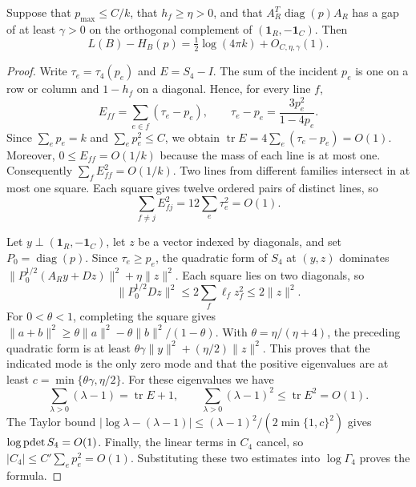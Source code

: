 \begin{lema}\label{coste-estatico}
Suppose that $p_{\max}\le C/k$, that $h_f\ge\eta>0$, and that
$A_R^T\operatorname{diag}(p)A_R$ has a gap of at least $\gamma>0$ on the orthogonal complement
of $(\mathbf1_R,-\mathbf1_C)$. Then
\[
 L(B)-H_B(p)=\tfrac12\log(4\pi k)+O_{C,\eta,\gamma}(1).
\]
\end{lema}
\begin{proof}
Write $\tau_e=\tau_4(p_e)$ and $E=S_4-I$. The sum of the incident $p_e$ is one on a row or column
and $1-h_f$ on a diagonal. Hence, for every line $f$,
\[
 E_{ff}=\sum_{e\in f}(\tau_e-p_e),\qquad
 \tau_e-p_e=\frac{3p_e^2}{1-4p_e}.
\]
Since $\sum_e p_e=k$ and $\sum_e p_e^2\le C$, we obtain
$\operatorname{tr}E=4\sum_e(\tau_e-p_e)=O(1)$. Moreover, $0\le E_{ff}=O(1/k)$ because the mass of
each line is at most one. Consequently $\sum_f E_{ff}^2=O(1/k)$. Two lines from different
families intersect in at most one square. Each square gives twelve ordered pairs of distinct lines, so
\[
 \sum_{f\ne j}E_{fj}^2=12\sum_e\tau_e^2=O(1).
\]

Let $y\perp(\mathbf1_R,-\mathbf1_C)$, let $z$ be a vector indexed by diagonals, and set
$P_0=\operatorname{diag}(p)$. Since $\tau_e\ge p_e$, the quadratic form of $S_4$ at $(y,z)$
dominates $\|P_0^{1/2}(A_Ry+Dz)\|^2+\eta\|z\|^2$. Each square lies on two diagonals, so
\[
 \|P_0^{1/2}Dz\|^2
 \le2\sum_f\ell_f z_f^2\le2\|z\|^2.
\]
For $0<\theta<1$, completing the square gives
$\|a+b\|^2\ge\theta\|a\|^2-\theta\|b\|^2/(1-\theta)$. With $\theta=\eta/(\eta+4)$, the preceding
quadratic form is at least $\theta\gamma\|y\|^2+(\eta/2)\|z\|^2$.
This proves that the indicated mode is the only zero mode and that the positive eigenvalues are at least
$c=\min\{\theta\gamma,\eta/2\}$. For these eigenvalues we have
\[
 \sum_{\lambda>0}(\lambda-1)=\operatorname{tr}E+1,\qquad
 \sum_{\lambda>0}(\lambda-1)^2\le\operatorname{tr}E^2=O(1).
\]
The Taylor bound $|\log\lambda-(\lambda-1)|\le
(\lambda-1)^2/(2\min\{1,c\}^2)$ gives $\log\operatorname{pdet} S_4=O(1)$.
Finally, the linear terms in $C_4$ cancel, so $|C_4|\le C'\sum_e p_e^2=O(1)$.
Substituting these two estimates into $\log\Gamma_4$ proves the formula.
\end{proof}
